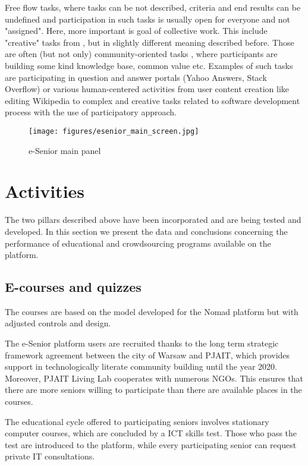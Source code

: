 \documentclass[sigconf]{acmart}
\begin{document}
Free flow tasks, where tasks can be not described, criteria and end results can be undefined and participation in such tasks is usually open for everyone and not "assigned". Here, more important is goal of collective work. This include "creative" tasks from \cite{schenk2011towards}, but in slightly different meaning described before. Those are often (but not only) community-oriented tasks \cite{rouse2010preliminary}, where participants are building some kind knowledge base, common value etc. Examples of such tasks are participating in question and answer portals (Yahoo Answers, Stack Overflow)
or various human-centered activities from user content creation like editing Wikipedia to complex and creative tasks related to software development process with the use of participatory approach.

\begin{figure}
\centering
\texttt{[image: figures/esenior\_main\_screen.jpg]}
\caption{e-Senior main panel}
\label{fig:esenior_main}
\end{figure}

\section{Activities}

The two pillars described above have been incorporated and are being tested and developed. In this section we present the data and conclusions concerning the performance of educational and crowdsourcing programs available on the platform.

\subsection{E-courses and quizzes}

The courses are based on the model developed for the Nomad platform but with adjusted controls and design.

The e-Senior platform users are recruited thanks to the long term strategic framework agreement between the city of Warsaw and PJAIT, which provides support in technologically literate community building until the year 2020. Moreover, PJAIT Living Lab cooperates with numerous NGOs. This ensures that there are more seniors willing to participate than there are available places in the courses.

The educational cycle offered to participating seniors involves stationary computer courses, which are concluded by a ICT skills test. Those who pass the test are introduced to the platform, while every participating senior can request private IT consultations. 
\end{document}
